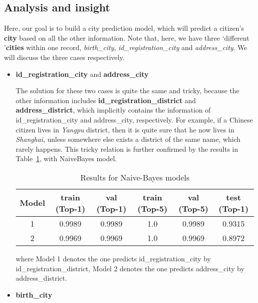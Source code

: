 \documentclass{article}
\begin{document}
\subsection{Analysis and insight}
Here, our goal is to build a city prediction model, which will predict a citizen's \textbf{city} based on all the other information. Note that, here, we have three `different '\textbf{cities} within one record, \emph{birth\_city}, \emph{id\_registration\_city} and \emph{address\_city}. We will discuss the three cases respectively.

\begin{itemize}
\item \textbf{id\_registration\_city} and \textbf{address\_city}

The solution for these two cases is quite the same and tricky, because the other information includes \textbf{id\_registration\_district} and \textbf{address\_district}, which implicitly contains the information of id\_registration\_city and address\_city, respectively. For example, if a Chinese citizen lives in \emph{Yangpu} district, then it is quite sure that he now lives in \emph{Shanghai}, unless somewhere else exists a district of the same name, which rarely happens. This tricky relation is further confirmed by the results in Table~\ref{tab-1-1}, with NaiveBayes model.
\begin{table}[ht]
\centering
\caption{Results for Naive-Bayes models}
\label{tab-1-1}
\begin{tabular}{cccccc}
\toprule
Model & train (Top-1) & val (Top-1) & train (Top-5) & val (Top-5) & test (Top-1)\\
\midrule
1 & 0.9989 & 0.9989 & 1.0 & 0.9989 & 0.9315 \\
2 & 0.9969 & 0.9969 & 1.0 & 0.9969 & 0.8972 \\
\bottomrule
\end{tabular}
\end{table}

where Model 1 denotes the one predicts id\_registration\_city by id\_registration\_district, Model 2 denotes the one predicts address\_city by address\_district.

\item \textbf{birth\_city}


\end{itemize}
\end{document}
